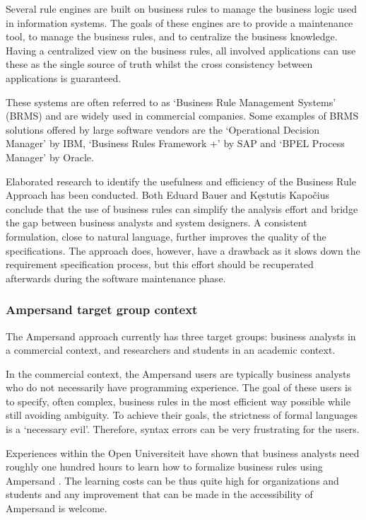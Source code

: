 Several rule engines are built on business rules to manage the business logic used in information systems. 
The goals of these engines are to provide a maintenance tool, to manage the business rules, and to centralize the business knowledge.
Having a centralized view on the business rules, all involved  applications can use these as the single source of truth whilst the cross consistency between applications is guaranteed.

%
These systems are often referred to as `Business Rule Management Systems' (BRMS) and are widely used in commercial companies.
%
Some examples of BRMS solutions offered by large software vendors are the `Operational Decision Manager' by IBM, `Business Rules Framework +' by SAP and `BPEL Process Manager' by Oracle.

Elaborated research to identify the usefulness and efficiency of the Business Rule Approach has been conducted.
Both Eduard Bauer  and Kęstutis Kapočius  conclude that the use of business rules can simplify the analysis effort and bridge the gap between business analysts and system designers. 
A consistent formulation, close to natural language, further improves the quality of the specifications.
The approach does, however, have a drawback as it slows down the requirement specification process, but this effort should be recuperated afterwards during the software maintenance phase.

\subsubsection{Ampersand target group context}
The Ampersand approach currently has three target groups: business analysts in a commercial context, and researchers and students in an academic context.

In the commercial context, the Ampersand users are typically business analysts who do not necessarily have programming experience.
The goal of these users is to specify, often complex, business rules in the most efficient way possible while still avoiding ambiguity.
To achieve their goals, the strictness of formal languages is a `necessary evil'.
Therefore, syntax errors can be very frustrating for the users.

Experiences within the Open Universiteit have shown that business analysts need roughly one hundred hours to learn how to formalize business rules using Ampersand .
The learning costs can be thus quite high for organizations and students and any improvement that can be made in the accessibility of Ampersand is welcome.

